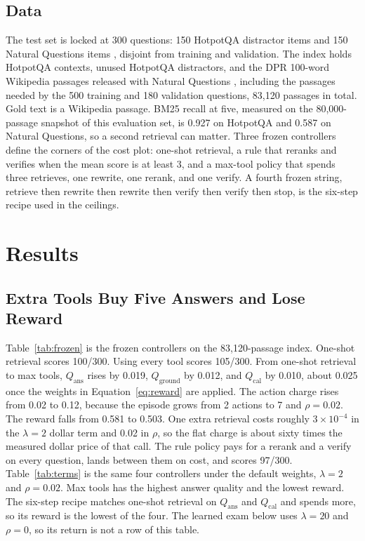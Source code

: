 \documentclass[letterpaper]{article} %
\begin{document}
\subsection{Data}
The test set is locked at 300 questions: 150 HotpotQA distractor items \cite{yang2018hotpotqa} and 150 Natural Questions items \cite{kwiatkowski2019nq}, disjoint from training and validation. The index holds HotpotQA contexts, unused HotpotQA distractors, and the DPR 100-word Wikipedia passages released with Natural Questions \cite{karpukhin2020dpr,gao2022tevatron}, including the passages needed by the 500 training and 180 validation questions, 83{,}120 passages in total. Gold text is a Wikipedia passage. BM25 recall at five, measured on the 80{,}000-passage snapshot of this evaluation set, is 0.927 on HotpotQA and 0.587 on Natural Questions, so a second retrieval can matter. Three frozen controllers define the corners of the cost plot: one-shot retrieval, a rule that reranks and verifies when the mean score is at least 3, and a max-tool policy that spends three retrieves, one rewrite, one rerank, and one verify. A fourth frozen string, retrieve then rewrite then rewrite then verify then verify then stop, is the six-step recipe used in the ceilings.

\section{Results}

\subsection{Extra Tools Buy Five Answers and Lose Reward}
Table~\ref{tab:frozen} is the frozen controllers on the 83{,}120-passage index. One-shot retrieval scores 100/300. Using every tool scores 105/300. From one-shot retrieval to max tools, \(Q_{\mathrm{ans}}\) rises by 0.019, \(Q_{\mathrm{ground}}\) by 0.012, and \(Q_{\mathrm{cal}}\) by 0.010, about 0.025 once the weights in Equation~\ref{eq:reward} are applied. The action charge rises from 0.02 to 0.12, because the episode grows from 2 actions to 7 and \(\rho{=}0.02\). The reward falls from 0.581 to 0.503. One extra retrieval costs roughly \(3\times 10^{-4}\) in the \(\lambda{=}2\) dollar term and 0.02 in \(\rho\), so the flat charge is about sixty times the measured dollar price of that call. The rule policy pays for a rerank and a verify on every question, lands between them on cost, and scores 97/300. Table~\ref{tab:terms} is the same four controllers under the default weights, \(\lambda{=}2\) and \(\rho{=}0.02\). Max tools has the highest answer quality and the lowest reward. The six-step recipe matches one-shot retrieval on \(Q_{\mathrm{ans}}\) and \(Q_{\mathrm{cal}}\) and spends more, so its reward is the lowest of the four. The learned exam below uses \(\lambda{=}20\) and \(\rho{=}0\), so its return is not a row of this table.
\end{document}
